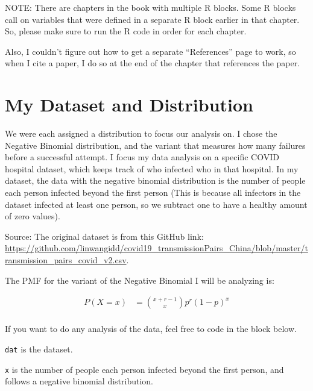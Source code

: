 \documentclass[
  letterpaper,
  DIV=11,
  numbers=noendperiod]{scrreprt}
\newenvironment{Shaded}{\begin{snugshade}}{\end{snugshade}}
\newcommand{\NormalTok}[1]{\textcolor[rgb]{0.00,0.23,0.31}{#1}}
\begin{document}
NOTE: There are chapters in the book with multiple R blocks. Some R
blocks call on variables that were defined in a separate R block earlier
in that chapter. So, please make sure to run the R code in order for
each chapter.

Also, I couldn't figure out how to get a separate ``References'' page to
work, so when I cite a paper, I do so at the end of the chapter that
references the paper.

\section*{My Dataset and
Distribution}\label{my-dataset-and-distribution}


We were each assigned a distribution to focus our analysis on. I chose
the Negative Binomial distribution, and the variant that measures how
many failures before a successful attempt. I focus my data analysis on a
specific COVID hospital dataset, which keeps track of who infected who
in that hospital. In my dataset, the data with the negative binomial
distribution is the number of people each person infected beyond the
first person (This is because all infectors in the dataset infected at
least one person, so we subtract one to have a healthy amount of zero
values).

Source: The original dataset is from this GitHub link:
\url{https://github.com/linwangidd/covid19_transmissionPairs_China/blob/master/transmission_pairs_covid_v2.csv}.

The PMF for the variant of the Negative Binomial I will be analyzing is:

\[
\begin{aligned}
    P(X=x) &= \binom{x + r- 1}{x} p^r (1 - p)^x \\
\end{aligned}
\]

If you want to do any analysis of the data, feel free to code in the
block below.

\texttt{dat} is the dataset.

\texttt{x} is the number of people each person infected beyond the first
person, and follows a negative binomial distribution.

\begin{Shaded}
\end{Shaded}
\end{document}
